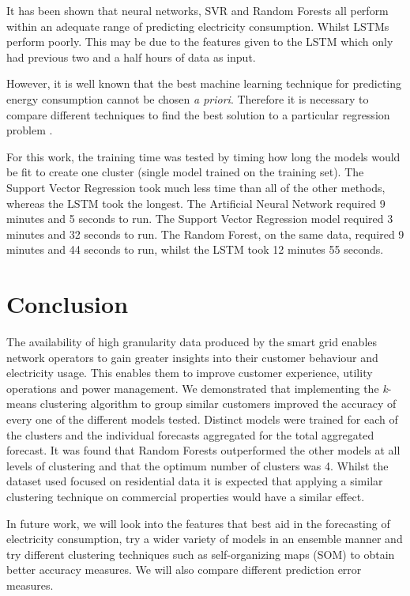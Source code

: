 It has been shown that neural networks, SVR and Random Forests all perform within an adequate range of predicting electricity consumption. Whilst LSTMs perform poorly. This may be due to the features given to the LSTM which only had previous two and a half hours of data as input. 

However, it is well known that the best machine learning technique for predicting energy consumption cannot be chosen \textit{a priori}. Therefore it is necessary to compare different techniques to find the best solution to a particular regression problem \cite{Ahmad2017}.

For this work, the training time was tested by timing how long the models would be fit to create one cluster (single model trained on the training set). The Support Vector Regression took much less time than all of the other methods, whereas the LSTM took the longest. The Artificial Neural Network required 9 minutes and 5 seconds to run. The Support Vector Regression model required 3 minutes and 32 seconds to run. The Random Forest, on the same data, required 9 minutes and 44 seconds to run, whilst the LSTM took 12 minutes 55 seconds. 


\section{Conclusion}

The availability of high granularity data produced by the smart grid enables network operators to gain greater insights into their customer behaviour and electricity usage. This enables them to improve customer experience, utility operations and power management. We demonstrated that implementing the \textit{k}-means clustering algorithm to group similar customers improved the accuracy of every one of the different models tested. Distinct models were trained for each of the clusters and the individual forecasts aggregated for the total aggregated forecast. It was found that Random Forests outperformed  the other models at all levels of clustering and that the optimum number of clusters was 4. Whilst the dataset used focused on residential data it is expected that applying a similar clustering technique on commercial properties would have a similar effect.

In future work, we will look into the features that best aid in the forecasting of electricity consumption, try a wider variety of models in an ensemble manner and try different clustering techniques such as self-organizing maps (SOM) to obtain better accuracy measures. We will also compare different prediction error measures.

